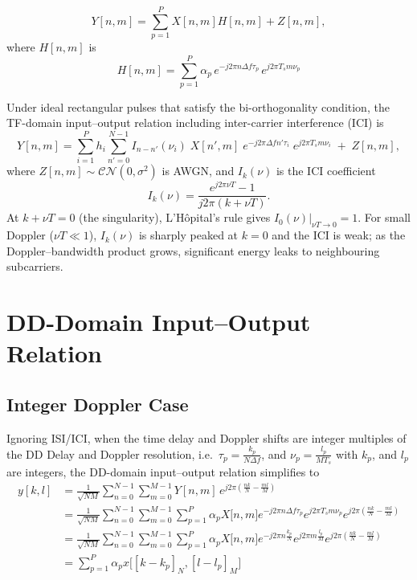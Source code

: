 \documentclass[11pt,a4paper]{article}
\newcommand{\deltaf}{\Delta f}
\newcommand{\CN}{\mathcal{CN}}
\begin{document}
\begin{equation}
  Y[n,m] = \sum_{p=1}^{P} X[n,m]H[n,m]  + Z[n,m],
  \label{eq:tf_io_ideal}
\end{equation}
where $H[n,m]$ is 
\begin{equation}
  H[n,m] = \sum_{p=1}^{P} \alpha_p\,e^{-j2\pi n\deltaf\tau_p}\,e^{j2\pi T_s m\nu_p}
  \label{eq:tf_channel}
\end{equation}

Under ideal rectangular pulses that satisfy the bi-orthogonality
condition, the TF-domain input--output relation including
inter-carrier interference (ICI) is
\begin{equation}
  Y[n,m] = \sum_{i=1}^{P} h_i
  \sum_{n'=0}^{N-1} I_{n-n'}(\nu_i)\;
  X[n',m]\;
  e^{-j2\pi\deltaf n'\tau_i}\;
  e^{j2\pi T_s m\nu_i}
  \;+\; Z[n,m],
  \label{eq:tf_io}
\end{equation}
where $Z[n,m]\sim\CN(0,\sigma^2)$ is AWGN, and
$I_k(\nu)$ is the ICI coefficient
\begin{equation}
  I_k(\nu) = \frac{e^{j2\pi\nu T}-1}{j2\pi(k+\nu T)}.
  \label{eq:ici_coeff}
\end{equation}
At $k + \nu T = 0$ (the singularity), L'H\^opital's rule gives
$I_0(\nu)|_{\nu T\to 0} = 1$. For small Doppler ($\nu T \ll 1$),
$I_k(\nu)$ is sharply peaked at $k=0$ and the ICI is weak; as the
Doppler--bandwidth product grows, significant energy leaks to
neighbouring subcarriers.

\section{DD-Domain Input--Output Relation}
\label{sec:dd_io}

\subsection{Integer Doppler Case}
Ignoring ISI/ICI, when the time delay and Doppler shifts are integer multiples of the DD Delay and Doppler resolution, i.e.\ $\tau_p = \frac{k_p}{N\deltaf}$, and $\nu_p = \frac{l_p}{MT_s}$ with $k_p$, and $l_p$ are integers, the DD-domain input--output relation simplifies to
\begin{align}
  y[k,l] &= \frac{1}{\sqrt{NM}}\sum_{n=0}^{N-1}\sum_{m=0}^{M-1}
  Y[n,m]\,e^{j2\pi\!\left(\frac{nk}{N}-\frac{ml}{M}\right)}\\
  &= \frac{1}{\sqrt{NM}}\sum_{n=0}^{N-1}\sum_{m=0}^{M-1}\sum_{p=1}^{P} \alpha_p X\!\bigl[n, m \bigr] e^{-j2\pi n\deltaf\tau_p} e^{j2\pi T_s m\nu_p}e^{j2\pi\!\left(\frac{nk}{N}-\frac{ml}{M}\right)} \\
  &= \frac{1}{\sqrt{NM}}\sum_{n=0}^{N-1}\sum_{m=0}^{M-1}\sum_{p=1}^{P} \alpha_p X\!\bigl[n, m \bigr] e^{-j2\pi n\frac{k_p}{N}} e^{j2\pi m\frac{l_p}{M}}e^{j2\pi\!\left(\frac{nk}{N}-\frac{ml}{M}\right)} \\
  &= \sum_{p=1}^{P} \alpha_p x\!\bigl[\left[k-k_p\right]_N, \left[l-l_p\right]_M \bigr]
\end{align}
\end{document}
